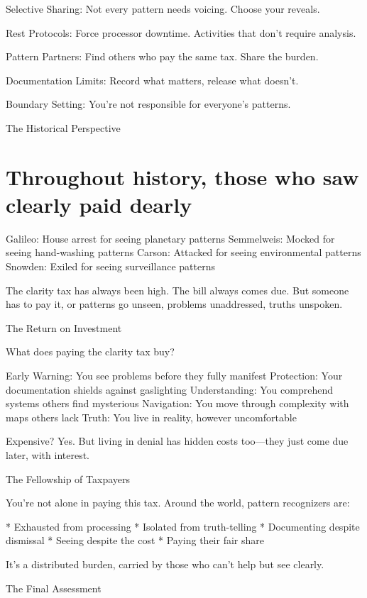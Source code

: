 \documentclass[12pt,oneside]{book}
\begin{document}
Selective Sharing: Not every pattern needs voicing. Choose your reveals.

Rest Protocols: Force processor downtime. Activities that don't require analysis.

Pattern Partners: Find others who pay the same tax. Share the burden.

Documentation Limits: Record what matters, release what doesn't.

Boundary Setting: You're not responsible for everyone's patterns.

The Historical Perspective

\section{Throughout history, those who saw clearly paid dearly}

Galileo: House arrest for seeing planetary patterns Semmelweis: Mocked for seeing hand-washing patterns Carson: Attacked for seeing environmental patterns Snowden: Exiled for seeing surveillance patterns

The clarity tax has always been high. The bill always comes due. But someone has to pay it, or patterns go unseen, problems unaddressed, truths unspoken.

The Return on Investment

What does paying the clarity tax buy?

Early Warning: You see problems before they fully manifest Protection: Your documentation shields against gaslighting Understanding: You comprehend systems others find mysterious Navigation: You move through complexity with maps others lack Truth: You live in reality, however uncomfortable

Expensive? Yes. But living in denial has hidden costs too---they just come due later, with interest.

The Fellowship of Taxpayers

You're not alone in paying this tax. Around the world, pattern recognizers are:

                    * Exhausted from processing
                    * Isolated from truth-telling
                    * Documenting despite dismissal
                    * Seeing despite the cost
                    * Paying their fair share

It's a distributed burden, carried by those who can't help but see clearly.

The Final Assessment
\end{document}
